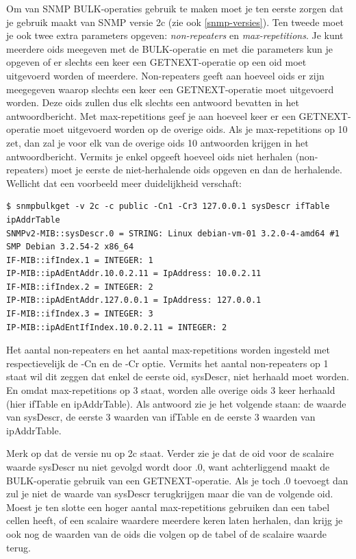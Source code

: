 Om van SNMP BULK-operaties gebruik te maken moet je ten eerste zorgen dat je gebruik maakt van SNMP versie 2c (zie ook \cref{snmp-versies}).
Ten tweede moet je ook twee extra parameters opgeven: \textit{non-repeaters} en \textit{max-repetitions}.
Je kunt meerdere \glspl{oid} meegeven met de BULK-operatie en met die parameters kun je opgeven of er slechts een keer
een GETNEXT-operatie op een \gls{oid} moet uitgevoerd worden of meerdere.
Non-repeaters geeft aan hoeveel \glspl{oid} er zijn meegegeven waarop slechts een keer een GETNEXT-operatie moet uitgevoerd worden.
Deze \glspl{oid} zullen dus elk slechts een antwoord bevatten in het antwoordbericht.
Met max-repetitions geef je aan hoeveel keer er een GETNEXT-operatie moet uitgevoerd worden op de overige \glspl{oid}.
Als je max-repetitions op 10 zet, dan zal je voor elk van de overige \glspl{oid} 10 antwoorden krijgen in het antwoordbericht.
Vermits je enkel opgeeft hoeveel \glspl{oid} niet herhalen (non-repeaters) moet je eerste de niet-herhalende \glspl{oid} opgeven en dan de herhalende.
Wellicht dat een voorbeeld meer duidelijkheid verschaft:

\begin{lstlisting}[float=h, caption={SNMP BULK-opdracht}, label=netsnmp-bulk]
$ snmpbulkget -v 2c -c public -Cn1 -Cr3 127.0.0.1 sysDescr ifTable ipAddrTable
SNMPv2-MIB::sysDescr.0 = STRING: Linux debian-vm-01 3.2.0-4-amd64 #1 SMP Debian 3.2.54-2 x86_64
IF-MIB::ifIndex.1 = INTEGER: 1
IP-MIB::ipAdEntAddr.10.0.2.11 = IpAddress: 10.0.2.11
IF-MIB::ifIndex.2 = INTEGER: 2
IP-MIB::ipAdEntAddr.127.0.0.1 = IpAddress: 127.0.0.1
IF-MIB::ifIndex.3 = INTEGER: 3
IP-MIB::ipAdEntIfIndex.10.0.2.11 = INTEGER: 2
\end{lstlisting}

Het aantal non-repeaters en het aantal max-repetitions worden ingesteld met respectievelijk de -Cn en de -Cr optie.
Vermits het aantal non-repeaters op 1 staat wil dit zeggen dat enkel de eerste \gls{oid}, sysDescr, niet herhaald moet worden.
En omdat max-repetitions op 3 staat, worden alle overige \glspl{oid} 3 keer herhaald (hier ifTable en ipAddrTable).
Als antwoord zie je het volgende staan: de waarde van sysDescr, de eerste 3 waarden van ifTable en de eerste 3 waarden van ipAddrTable.

Merk op dat de versie nu op 2c staat. Verder zie je dat de \gls{oid} voor de scalaire waarde sysDescr nu niet gevolgd wordt door .0,
want achterliggend maakt de BULK-operatie gebruik van een GETNEXT-operatie.
Als je toch .0 toevoegt dan zul je niet de waarde van sysDescr terugkrijgen maar die van de volgende \gls{oid}.
Moest je ten slotte een hoger aantal max-repetitions gebruiken dan een tabel cellen heeft,
of een scalaire waardere meerdere keren laten herhalen, dan krijg je ook nog de waarden van de \glspl{oid} die volgen op de tabel of de scalaire waarde terug.


